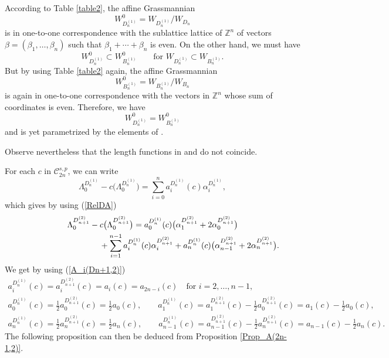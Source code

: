 \documentclass[pdftex]{sigma}
\numberwithin{equation}{section}
\begin{document}
According to Table \ref{table2}, the affine Grassmannian
\[
W_{D_{n}^{(1)}}^{0}=W_{D_{n}^{(1)}}/W_{D_{n}}
\]
 is in one-to-one
correspondence with the sublattice lattice of $\mathbb{Z}^{n}$ of vectors $%
\beta =(\beta _{1},\dots ,\beta _{n})$ such that $\beta _{1}+\cdots +\beta
_{n}$ is even. On the other hand, we must have
\[
W_{D_{n}^{(1)}}^{0}\subset
W_{B_{n}^{(1)}}^{0}\qquad \text{for $W_{D_{n}^{(1)}}\subset W_{B_{n}^{(1)}}$}.
\]
 But by
using Table \ref{table2} again, the affine Grassmannian
\[
W_{B_{n}^{(1)}}^{0}=W_{B_{n}^{(1)}}/W_{B_{n}}
\]
 is again in one-to-one
correspondence with the vectors in $\mathbb{Z}^{n}$ whose sum of coordinates
is even. Therefore, we have
\[
W_{D_{n}^{(1)}}^{0}=W_{B_{n}^{(1)}}^{0}
\]
 and 
 is yet parametrized by the elements of .

 Observe nevertheless that the length functions in  and  do not coincide.



For each $c$ in $\mathcal{C}_{2n}^{s,p}$, we can write%
\begin{equation*}
\Lambda _{0}^{D_{n}^{(1)}}-c\bigl(\Lambda
_{0}^{D_{n}^{(1)}}\bigr)=\sum_{i=0}^{n}a_{i}^{D_{n}^{(1)}}(c)\alpha
_{i}^{D_{n}^{(1)}},
\end{equation*}%
which gives by using (\ref{RelDA})%
\begin{gather*}
\Lambda _{0}^{D_{n+1}^{(2)}}-c\bigl(\Lambda_{0}^{D_{n+1}^{(2)}}\bigr)= a_{0}^{D_{n}^{(1)}}(c)\bigl(\alpha_{1}^{D_{n+1}^{(2)}}+2\alpha_{0}^{D_{n+1}^{(2)}}\bigr) \\
\hphantom{\Lambda _{0}^{D_{n+1}^{(2)}}-c(\Lambda_{0}^{D_{n+1}^{(2)}})=}{}
+\sum_{i=1}^{n-1}a_{i}^{D_{n}^{(1)}}(c)\alpha_{i}^{D_{n+1}^{(2)}}+a_{n}^{D_{n}^{(1)}}(c)\bigl(\alpha_{n-1}^{D_{n+1}^{(2)}}+2\alpha _{n}^{D_{n+1}^{(2)}}\bigr) .
\end{gather*}
We get by using (\ref{A_i(Dn+1,2)})
\begin{gather*}
a_{i}^{D_{n}^{(1)}}(c)=a_{i}^{D_{n+1}^{(2)}}(c)=a_{i}(c)=a_{2n-i}(c)\quad \text{for }i=2,\dots ,n-1 ,\\
a_{0}^{D_{n}^{(1)}}(c)=\frac{1}{2}a_{0}^{D_{n+1}^{(2)}}(c)=\frac{1}{2}
a_{0}(c), \qquad a_{1}^{D_{n}^{(1)}}(c)=a_{1}^{D_{n+1}^{(2)}}(c)-\frac{1}{
	2}a_{0}^{D_{n+1}^{(2)}}(c)=a_{1}(c)-\frac{1}{2}a_{0}(c) ,\\
a_{n}^{D_{n}^{(1)}}(c)=\frac{1}{2}a_{n}^{D_{n+1}^{(2)}}(c)=\frac{1}{2}
a_{n}(c),\qquad  a_{n-1}^{D_{n}^{(1)}}(c)=a_{n-1}^{D_{n+1}^{(2)}}(c)-
\frac{1}{2}a_{n}^{D_{n+1}^{(2)}}(c)=a_{n-1}(c)-\frac{1}{2}a_{n}(c).	
\end{gather*}
The following proposition can then be deduced from Proposition \ref{Prop_A(2n-1,2)}.
\end{document}
